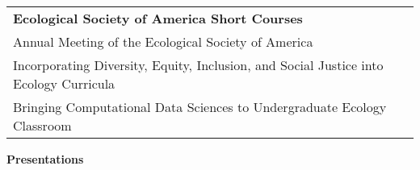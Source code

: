 \documentclass[letterpaper,11pt,oneside]{article}
\begin{document}
\def\arraystretch{1.1}
\noindent \begin{longtable}{@{} >{\raggedright\arraybackslash}p{15.5cm} >{\raggedright\arraybackslash}p{1.7cm}}

 \textbf{Ecological Society of America Short Courses}  & 2021\\
Annual Meeting of the Ecological Society of America & \\
  \hspace{5mm} Incorporating Diversity, Equity, Inclusion, and Social Justice into Ecology Curricula & \\
  \hspace{5mm} Bringing Computational Data Sciences to Undergraduate Ecology Classroom & \\
\end{longtable}

\bigskip






\noindent\Large{\textbf{Presentations}} 
\normalsize
\bigskip
\end{document}
